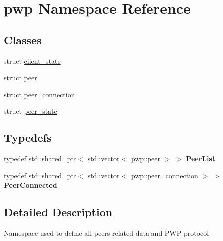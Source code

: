 \hypertarget{namespacepwp}{}\section{pwp Namespace Reference}
\label{namespacepwp}
\subsection*{Classes}
\begin{DoxyCompactItemize}
\item 
struct \hyperlink{structpwp_1_1client__state}{client\+\_\+state}
\item 
struct \hyperlink{structpwp_1_1peer}{peer}
\item 
struct \hyperlink{structpwp_1_1peer__connection}{peer\+\_\+connection}
\item 
struct \hyperlink{structpwp_1_1peer__state}{peer\+\_\+state}
\end{DoxyCompactItemize}
\subsection*{Typedefs}
\begin{DoxyCompactItemize}
\item 
\mbox{\label{namespacepwp_ad07fa6df116b205302ad5ec172277184}} 
typedef std\+::shared\+\_\+ptr$<$ std\+::vector$<$ \hyperlink{structpwp_1_1peer}{pwp\+::peer} $>$ $>$ {\bfseries Peer\+List}
\item 
\mbox{\label{namespacepwp_a174e8f020062fa10258b0d28f00d79ff}} 
typedef std\+::shared\+\_\+ptr$<$ std\+::vector$<$ \hyperlink{structpwp_1_1peer__connection}{pwp\+::peer\+\_\+connection} $>$ $>$ {\bfseries Peer\+Connected}
\end{DoxyCompactItemize}


\subsection{Detailed Description}
Namespace used to define all peer\textquotesingle{}s related data and P\+WP protocol 